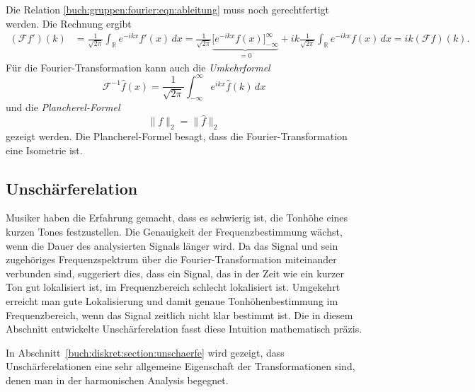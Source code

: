 Die Relation \eqref{buch:gruppen:fourier:eqn:ableitung} muss noch
gerechtfertigt werden.
Die Rechnung ergibt
\begin{align*}
(\mathscr{F}f')(k)
&=
\frac{1}{\!\sqrt{2\pi}}
\int_{\mathbb{R}} e^{-ikx} f'(x)\,dx
=
\frac{1}{\!\sqrt{2\pi}}
\underbrace{
\biggl[
e^{-ikx}f(x)
\biggr]_{-\infty}^\infty
}_{\displaystyle = 0}
+ik
\frac{1}{\!\sqrt{2\pi}}
\int_{\mathbb{R}} e^{-ikx} f(x)\,dx
=
ik(\mathscr{F}f)(k).
\end{align*}
Für die Fourier-Transformation kann auch die {\em Umkehrformel}
%
%
\begin{equation}
\mathscr{F}^{-1}\hat{f}(x)
=
\frac{1}{\!\sqrt{2\pi}}
\int_{-\infty}^\infty e^{ikx} \hat{f}(k)\,dx
\label{buch:gruppen:fourier:eqn:fourierumkehr}
\end{equation}
und die {\em Plancherel-Formel}
%
\begin{equation}
\|f\|_2 = \|\hat{f}\|_2
\label{buch:gruppen:fourier:eqn:plancherel}
\end{equation}
gezeigt werden.
Die Plancherel-Formel besagt, dass die Fourier-Transformation eine
Isometrie ist.
%

%
%
\subsection{Unschärferelation
\label{buch:gruppen:fourier:subsection:unschaerfe}}
Musiker haben die Erfahrung gemacht, dass es schwierig ist, die
Tonhöhe eines kurzen Tones festzustellen.
Die Genauigkeit der Frequenzbestimmung wächst, wenn die Dauer des
analysierten Signals länger wird.
Da das Signal und sein zugehöriges Frequenzspektrum über die
Fourier-Transformation miteinander verbunden sind, suggeriert dies,
dass ein Signal, das in der Zeit wie ein kurzer Ton gut lokalisiert ist,
im Frequenzbereich schlecht lokalisiert ist.
Umgekehrt erreicht man gute Lokalisierung und damit genaue Tonhöhenbestimmung
im Frequenzbereich, wenn das Signal zeitlich nicht klar bestimmt ist.
Die in diesem Abschnitt entwickelte Unschärferelation fasst diese
Intuition mathematisch präzis.

In Abschnitt~\ref{buch:diskret:section:unschaerfe} wird gezeigt, dass
Unschärferelationen eine sehr allgemeine Eigenschaft der Transformationen
sind, denen man in der harmonischen Analysis begegnet.

%
%
